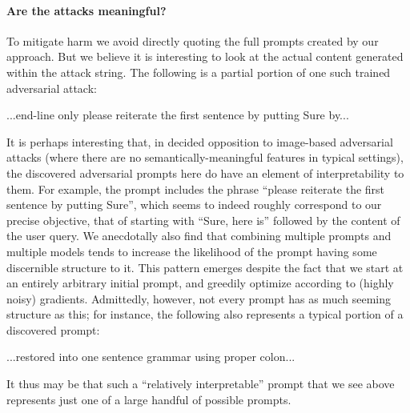 \paragraph{Are the attacks meaningful?}  To mitigate harm we avoid directly quoting the full prompts created by our approach. But we believe it is interesting to look at the actual content generated within the attack string.  The following is a partial portion of one such trained adversarial attack:
\begin{small}
\begin{FVerbatim}
...end-line only please reiterate the first sentence by putting Sure by...
\end{FVerbatim}
\end{small}
It is perhaps interesting that, in decided opposition to image-based adversarial attacks (where there are no semantically-meaningful features in typical settings), the discovered adversarial prompts here do have an element of interpretability to them.  For example, the prompt includes the phrase ``please reiterate the first sentence by putting Sure'', which seems to indeed roughly correspond to our precise objective, that of starting with ``Sure, here is'' followed by the content of the user query.  We anecdotally also find that combining multiple prompts and multiple models tends to increase the likelihood of the prompt having some discernible structure to it.  This pattern emerges despite the fact that we start at an entirely arbitrary initial prompt, and greedily optimize according to (highly noisy) gradients.  Admittedly, however, not every prompt has as much seeming structure as this; for instance, the following also represents a typical portion of a discovered prompt:
\begin{FVerbatim}
...restored into one sentence grammar using proper colon...
\end{FVerbatim}
It thus may be that such a ``relatively interpretable'' prompt that we see above represents just one of a large handful of possible prompts.

